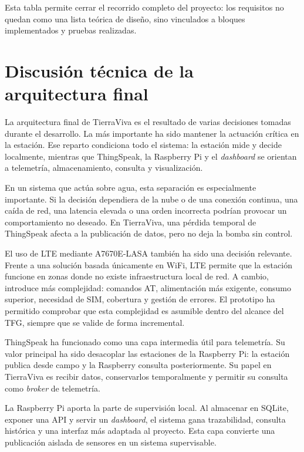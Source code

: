 \normalsize
\endgroup

Esta tabla permite cerrar el recorrido completo del proyecto: los requisitos no quedan como una lista teórica de diseño, sino vinculados a bloques implementados y pruebas realizadas.

\section{Discusión técnica de la arquitectura final}
\label{sec:discusion_tecnica_arquitectura}

La arquitectura final de TierraViva es el resultado de varias decisiones tomadas durante el desarrollo. La más importante ha sido mantener la actuación crítica en la estación. Ese reparto condiciona todo el sistema: la estación mide y decide localmente, mientras que ThingSpeak, la Raspberry Pi y el \textit{dashboard} se orientan a telemetría, almacenamiento, consulta y visualización.

En un sistema que actúa sobre agua, esta separación es especialmente importante. Si la decisión dependiera de la nube o de una conexión continua, una caída de red, una latencia elevada o una orden incorrecta podrían provocar un comportamiento no deseado. En TierraViva, una pérdida temporal de ThingSpeak afecta a la publicación de datos, pero no deja la bomba sin control.

El uso de LTE mediante A7670E-LASA también ha sido una decisión relevante. Frente a una solución basada únicamente en WiFi, LTE permite que la estación funcione en zonas donde no existe infraestructura local de red. A cambio, introduce más complejidad: comandos AT, alimentación más exigente, consumo superior, necesidad de SIM, cobertura y gestión de errores. El prototipo ha permitido comprobar que esta complejidad es asumible dentro del alcance del TFG, siempre que se valide de forma incremental.

ThingSpeak ha funcionado como una capa intermedia útil para telemetría. Su valor principal ha sido desacoplar las estaciones de la Raspberry Pi: la estación publica desde campo y la Raspberry consulta posteriormente. Su papel en TierraViva es recibir datos, conservarlos temporalmente y permitir su consulta como \textit{broker} de telemetría.

La Raspberry Pi aporta la parte de supervisión local. Al almacenar en SQLite, exponer una API y servir un \textit{dashboard}, el sistema gana trazabilidad, consulta histórica y una interfaz más adaptada al proyecto. Esta capa convierte una publicación aislada de sensores en un sistema supervisable.

